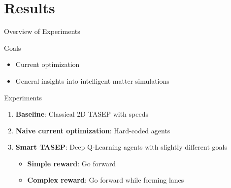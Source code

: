 \documentclass[10pt,xcolor=table, aspectratio=1610]{beamer}
\begin{document}
\section[Results]{Results}
\begin{frame}{Overview of Experiments}
  \begin{block}{Goals}
    \begin{itemize}
      \item Current optimization
      \item General insights into intelligent matter simulations  
    \end{itemize}
  \end{block}
  \begin{block}{Experiments}
  \begin{enumerate}
    \item \textbf{Baseline}: Classical 2D TASEP with speeds
    \item \textbf{Naive current optimization}: Hard-coded agents
    \item \textbf{Smart TASEP}: Deep Q-Learning agents with slightly different goals
    \begin{itemize}
      \item \textbf{Simple reward}: Go forward
      \item \textbf{Complex reward}: Go forward while forming lanes
    \end{itemize}
  \end{enumerate}
  \end{block}
\end{frame}
\end{document}
